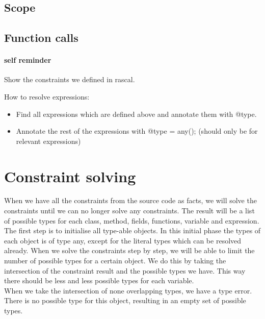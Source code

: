 \documentclass[../main.tex]{subfiles}
\begin{document}
    \subsection{Scope}
    
    \subsection{Function calls}
    
    \paragraph{self reminder}
    Show the constraints we defined in rascal.
    
    How to resolve expressions:
    \begin{itemize}
        \item Find all expressions which are defined above and annotate them with @type.
        \item Annotate the rest of the expressions with @type = any(); (should only be for relevant expressions)
    \end{itemize}
    
    \section{Constraint solving}\label{sec:research:constraint_solving}
    When we have all the constraints from the source code as facts, we will solve the constraints until we can no longer solve any constraints.
    The result will be a list of possible types for each class, method, fields, functions, variable and expression.
    \\
    The first step is to initialise all type-able objects.
    In this initial phase the types of each object is of type any, except for the literal types which can be resolved already.
    When we solve the constraints step by step, we will be able to limit the number of possible types for a certain object.
    We do this by taking the intersection of the constraint result and the possible types we have.
    This way there should be less and less possible types for each variable.
    \\
    When we take the intersection of none overlapping types, we have a type error.
    There is no possible type for this object, resulting in an empty set of possible types.
    
\end{document}

